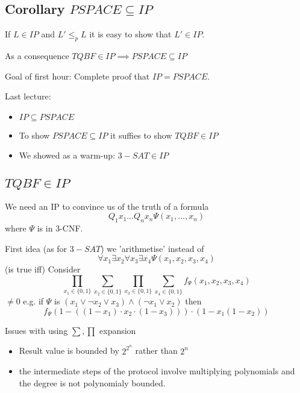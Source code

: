\documentclass[a4paper,12pt]{article}
\theoremstyle{definition}
\theoremstyle{remark}
\begin{document}
\subsection*{Corollary $PSPACE \subseteq IP$}
If $L \in IP$ and $L' \leq_p L$ it is easy to show that $L' \in IP$.

As a consequence $TQBF \in IP \implies PSPACE \subseteq IP$







\newpage
Goal of first hour: Complete proof that $IP = PSPACE$.

Last lecture:
\begin{itemize}
    \item $IP \subseteq PSPACE$
    \item To show $PSPACE \subseteq IP$ it suffies to show $TQBF \in IP$
    \item We showed as a warm-up: $3-SAT \in IP$
\end{itemize}

\subsection{$TQBF \in IP$}
We need an IP to convince us of the truth of a formula
\begin{equation*}
    Q_1 x_1 \dots Q_n x_n \Psi (x_1, \dots, x_n)
\end{equation*}
where $\Psi$ is in 3-CNF.

First idea (as for $3-SAT$) we 'arithmetise' instead of 
\begin{equation*}
    \forall x_1 \exists x_2 \forall x_3 \exists x_4 \Psi (x_1, x_2, x_3, x_4)
\end{equation*}
(is true iff)
Consider
\begin{equation*}
    \prod_{x_1 \in \{0, 1\}} \sum_{x_2 \in \{0, 1\}} \prod_{x_3 \in \{0, 1\}} \sum_{x_4 \in \{0, 1\}} f_\Psi (x_1, x_2, x_3, x_4)
\end{equation*}
$ \neq 0$
e.g. if $\Psi$ is $(x_1 \lor \neg x_2 \lor x_3) \land (\neg x_1 \lor x_2)$ then
\begin{equation*}
    f_\Psi (1 - ((1 - x_1) \cdot x_2 \cdot (1 - x_3))) \cdot (1 - x_1 (1 - x_2))
\end{equation*}

Issues with using $\sum, \prod$ expansion
\begin{itemize}
    \item Result value is bounded by $2^{2^n}$ rather than $2^n$
    \item the intermediate steps of the protocol involve multiplying polynomials and the degree is not polynomialy bounded.
\end{itemize}
\end{document}
